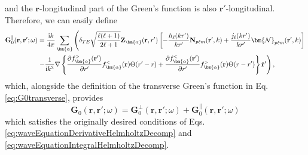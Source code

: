 and the $\mathbf{r}$-longitudinal part of the Green's function is also $\mathbf{r}'$-longitudinal. Therefore, we can easily define
\begin{equation}\label{eq:G0longitudinal}
\begin{split}
\mathbf{G}_0^\parallel(\mathbf{r},\mathbf{r}';\omega) &= \frac{\mathrm{i}k}{4\pi}\sum_{\bm{\alpha}}\left(\delta_{TE}\sqrt{\frac{\ell(\ell + 1)}{2\ell + 1}}\mathbf{Z}_{\bm{\alpha}}(\mathbf{r},r')\left[-\frac{h_\ell(kr')}{kr'}\mathbf{N}_{p\ell m}(\mathbf{r}',k) + \frac{j_\ell(kr')}{kr'}\bm{\mathcal{N}}_{p\ell m}(\mathbf{r}',k)\right]\right.\\
&\left. -\frac{1}{\mathrm{i} k^3}\nabla\left\{\frac{\partial f_{\bm{\alpha}}^>(\mathbf{r}')}{\partial r'}f_{\bm{\alpha}}^<(\mathbf{r})\Theta(r' - r) + \frac{\partial f_{\bm{\alpha}}^<(\mathbf{r}')}{\partial r'}f_{\bm{\alpha}}^>(\mathbf{r})\Theta(r - r')\right\}\hat{\mathbf{r}}' \vphantom{\sqrt{\frac{\ell(\ell + 1)}{2\ell + 1}}} \right),
\end{split}
\end{equation}
which, alongside the definition of the transverse Green's function in Eq. \eqref{eq:G0transverse}, provides
\begin{equation}
\mathbf{G}_0(\mathbf{r},\mathbf{r}';\omega) = \mathbf{G}_0^\perp(\mathbf{r},\mathbf{r}';\omega) + \mathbf{G}_0^\parallel(\mathbf{r},\mathbf{r}';\omega)
\end{equation}
which satisfies the originally desired conditions of Eqs. \eqref{eq:waveEquationDerivativeHelmholtzDecomp} and \eqref{eq:waveEquationIntegralHelmholtzDecomp}.